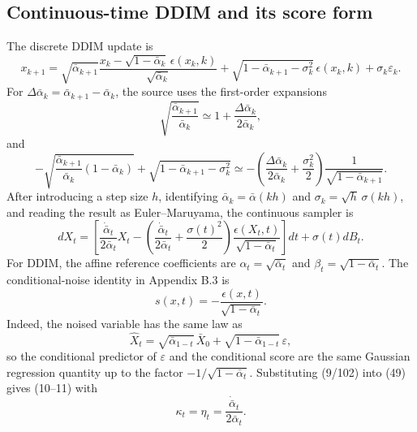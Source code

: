 \subsection{Continuous-time DDIM and its score form}

The discrete DDIM update is
\begin{equation*}
 x_{k+1}
 =\sqrt{\bar\alpha_{k+1}}
 \frac{x_k-\sqrt{1-\bar\alpha_k}\,\epsilon(x_k,k)}{\sqrt{\bar\alpha_k}}
 +\sqrt{1-\bar\alpha_{k+1}-\sigma_k^2}\,\epsilon(x_k,k)
 +\sigma_k\varepsilon_k.
 \tag{44}
\end{equation*}
For $\Delta\bar\alpha_k=\bar\alpha_{k+1}-\bar\alpha_k$, the source uses the first-order expansions
\begin{equation*}
 \sqrt{\frac{\bar\alpha_{k+1}}{\bar\alpha_k}}
 \simeq 1+\frac{\Delta\bar\alpha_k}{2\bar\alpha_k},
 \tag{45}
\end{equation*}
and
\begin{equation*}
 -\sqrt{\frac{\bar\alpha_{k+1}}{\bar\alpha_k}(1-\bar\alpha_k)}
 +\sqrt{1-\bar\alpha_{k+1}-\sigma_k^2}
 \simeq
 -\left(\frac{\Delta\bar\alpha_k}{2\bar\alpha_k}+\frac{\sigma_k^2}{2}\right)
 \frac{1}{\sqrt{1-\bar\alpha_{k+1}}}.
 \tag{46}
\end{equation*}
After introducing a step size $h$, identifying $\bar\alpha_k=\bar\alpha(kh)$ and $\sigma_k=\sqrt h\,\sigma(kh)$, and reading the result as Euler--Maruyama, the continuous sampler is
\begin{equation*}
 dX_t=
 \left[
 \frac{\dot{\bar\alpha}_t}{2\bar\alpha_t}X_t
 -\left(
 \frac{\dot{\bar\alpha}_t}{2\bar\alpha_t}
 +\frac{\sigma(t)^2}{2}
 \right)
 \frac{\epsilon(X_t,t)}{\sqrt{1-\bar\alpha_t}}
 \right]dt+\sigma(t)dB_t.
 \tag{49}
\end{equation*}
For DDIM, the affine reference coefficients are $\alpha_t=\sqrt{\bar\alpha_t}$ and $\beta_t=\sqrt{1-\bar\alpha_t}$.  The conditional-noise identity in Appendix B.3 is
\begin{equation*}
 s(x,t)=-\frac{\epsilon(x,t)}{\sqrt{1-\bar\alpha_t}}.
 \tag{9/102}
\end{equation*}
Indeed, the noised variable has the same law as
\[
 \widehat X_t=\sqrt{\bar\alpha_{1-t}}\,\bar X_0+
 \sqrt{1-\bar\alpha_{1-t}}\,\varepsilon,
\]
so the conditional predictor of $\varepsilon$ and the conditional score are the same Gaussian regression quantity up to the factor $-1/\sqrt{1-\bar\alpha_t}$.  Substituting (9/102) into (49) gives (10--11) with
\[
 \kappa_t=\eta_t=\frac{\dot{\bar\alpha}_t}{2\bar\alpha_t}.
\]

